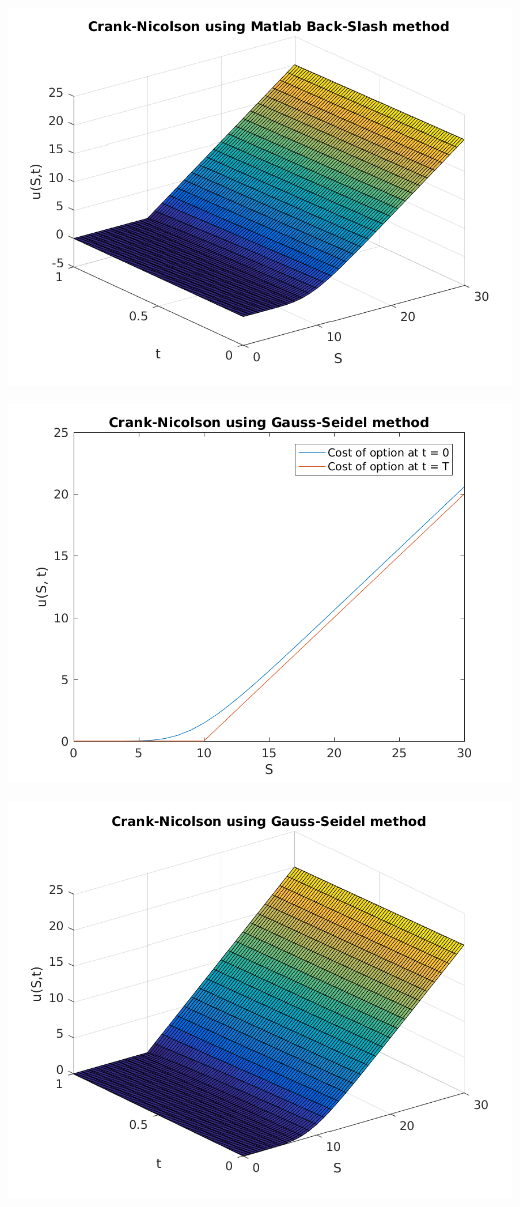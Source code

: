 \documentclass{article}
\begin{document}
\includegraphics{"q1_12"}
\pagebreak


\includegraphics{"q1_13"}
\pagebreak


\includegraphics{"q1_14"}
\pagebreak
\end{document}

